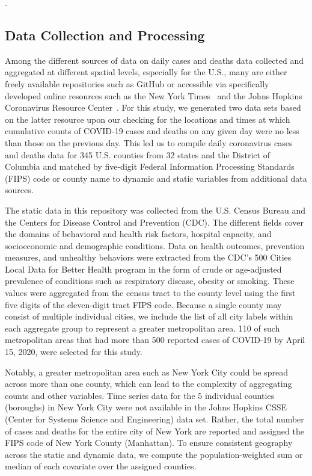 \documentclass[letterpaper, inpress]{jds} %
\renewcommand{\_}{%
    \textunderscore\hspace{0pt}%
}
\begin{document}
.






\subsection{Data Collection and Processing}

Among the different sources of data on daily cases and deaths data
collected and aggregated at different spatial levels, especially for
the U.S., many are either freely available repositories such as GitHub
or accessible via specifically developed online resources such as the
New York Times~\citep{github-nytimes} and the Johns Hopkins
Coronavirus Resource Center~\citep{www-jh-covid19}.  For this study,
we generated two data sets based on the latter resource upon our
checking for the locations and times at which cumulative counts of
COVID-19 cases and deaths on any given day were no less than those on
the previous day. This led us to compile daily coronavirus cases and
deaths data for 345 U.S. counties from 32 states and the District of
Columbia and matched by five-digit Federal Information Processing
Standards (FIPS) code or county name to dynamic and static variables
from additional data sources.

The static data in this repository was collected from the U.S. Census
Bureau and the Centers for Disease Control and Prevention (CDC). The
different fields cover the domains of behavioral and health risk
factors, hospital capacity, and socioeconomic and demographic
conditions. Data on health outcomes, prevention measures, and
unhealthy behaviors were extracted from the CDC's 500 Cities Local
Data for Better Health program \citep{www-cdc-chronic-data} in the form
of crude or age-adjusted prevalence of conditions such as respiratory
disease, obesity or smoking. These values were aggregated from the
census tract to the county level using the first five digits of the
eleven-digit tract FIPS code. Because a single county may consist of
multiple individual cities, we include the list of all city labels
within each aggregate group to represent a greater metropolitan
area. 110 of such metropolitan areas that had more than 500 reported
cases of COVID-19 by April 15, 2020, were selected for this study.

Notably, a greater metropolitan area such as New York City could be
spread across more than one county, which can lead to the complexity
of aggregating counts and other variables. Time series data for the 5
individual counties (boroughs) in New York City were not available in
the Johns Hopkins CSSE (Center for Systems Science and Engineering)
data set. Rather, the total number of cases and deaths for the entire
city of New York are reported and assigned the FIPS code of New York
County (Manhattan). To ensure consistent geography across the static
and dynamic data, we compute the population-weighted sum or median of
each covariate over the assigned counties.
\end{document}
